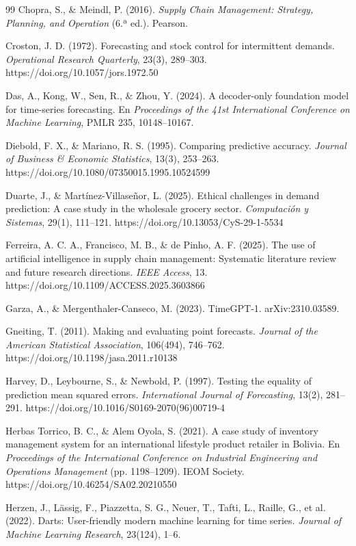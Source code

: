 \begin{thebibliography}{99}
 Chopra, S., \& Meindl, P. (2016). \textit{Supply Chain Management: Strategy, Planning, and Operation} (6.ª ed.). Pearson.

 Croston, J. D. (1972). Forecasting and stock control for intermittent demands. \textit{Operational Research Quarterly}, 23(3), 289--303. https://doi.org/10.1057/jors.1972.50

 Das, A., Kong, W., Sen, R., \& Zhou, Y. (2024). A decoder-only foundation model for time-series forecasting. En \textit{Proceedings of the 41st International Conference on Machine Learning}, PMLR 235, 10148--10167.

 Diebold, F. X., \& Mariano, R. S. (1995). Comparing predictive accuracy. \textit{Journal of Business \& Economic Statistics}, 13(3), 253--263. https://doi.org/10.1080/07350015.1995.10524599

 Duarte, J., \& Martínez-Villaseñor, L. (2025). Ethical challenges in demand prediction: A case study in the wholesale grocery sector. \textit{Computación y Sistemas}, 29(1), 111--121. https://doi.org/10.13053/CyS-29-1-5534

 Ferreira, A. C. A., Francisco, M. B., \& de Pinho, A. F. (2025). The use of artificial intelligence in supply chain management: Systematic literature review and future research directions. \textit{IEEE Access}, 13. https://doi.org/10.1109/ACCESS.2025.3603866

 Garza, A., \& Mergenthaler-Canseco, M. (2023). TimeGPT-1. arXiv:2310.03589.

 Gneiting, T. (2011). Making and evaluating point forecasts. \textit{Journal of the American Statistical Association}, 106(494), 746--762. https://doi.org/10.1198/jasa.2011.r10138

 Harvey, D., Leybourne, S., \& Newbold, P. (1997). Testing the equality of prediction mean squared errors. \textit{International Journal of Forecasting}, 13(2), 281--291. https://doi.org/10.1016/S0169-2070(96)00719-4

 Herbas Torrico, B. C., \& Alem Oyola, S. (2021). A case study of inventory management system for an international lifestyle product retailer in Bolivia. En \textit{Proceedings of the International Conference on Industrial Engineering and Operations Management} (pp. 1198--1209). IEOM Society. https://doi.org/10.46254/SA02.20210550

 Herzen, J., Lässig, F., Piazzetta, S. G., Neuer, T., Tafti, L., Raille, G., et al. (2022). Darts: User-friendly modern machine learning for time series. \textit{Journal of Machine Learning Research}, 23(124), 1--6.


\end{thebibliography}
